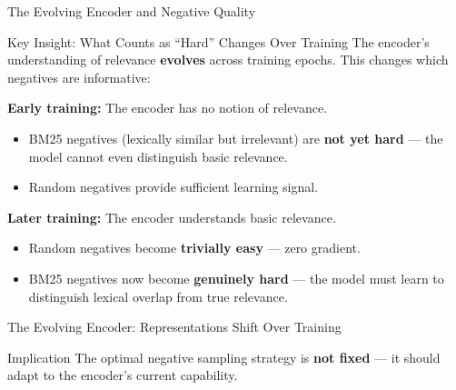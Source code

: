 \documentclass[aspectratio=169]{beamer}
\newif\ifanimated
\newcommand{\cpause}{\ifanimated\pause\fi}
\begin{document}
\begin{frame}{The Evolving Encoder and Negative Quality}
\begin{block}{Key Insight: What Counts as ``Hard'' Changes Over Training}
The encoder's understanding of relevance \textbf{evolves} across training epochs. This changes which negatives are informative:
\end{block}

\cpause
\vspace{0.5em}

\textbf{Early training:} The encoder has no notion of relevance.
\begin{itemize}
    \item BM25 negatives (lexically similar but irrelevant) are \textbf{not yet hard} --- the model cannot even distinguish basic relevance.
    \item Random negatives provide sufficient learning signal.
\end{itemize}

\cpause
\vspace{0.5em}

\textbf{Later training:} The encoder understands basic relevance.
\begin{itemize}
    \item Random negatives become \textbf{trivially easy} --- zero gradient.
    \item BM25 negatives now become \textbf{genuinely hard} --- the model must learn to distinguish lexical overlap from true relevance.
\end{itemize}

\end{frame}


\begin{frame}[shrink=20]{The Evolving Encoder: Representations Shift Over Training}
\begin{center}

\end{center}

\cpause
\vspace{0.3em}

\begin{alertblock}{Implication}
The optimal negative sampling strategy is \textbf{not fixed} --- it should adapt to the encoder's current capability.
\end{alertblock}
\end{frame}
\end{document}
